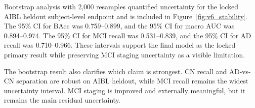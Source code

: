Bootstrap analysis with 2{,}000 resamples quantified uncertainty for the locked AIBL heldout subject-level endpoint and is included in Figure~\ref{fig:v6_stability}. The 95\% CI for BAcc was 0.759--0.899, and the 95\% CI for macro AUC was 0.894--0.974. The 95\% CI for MCI recall was 0.531--0.839, and the 95\% CI for AD recall was 0.710--0.966. These intervals support the final model as the locked primary result while preserving MCI staging uncertainty as a visible limitation.

The bootstrap result also clarifies which claim is strongest. CN recall and AD-vs-CN separation are robust on AIBL heldout, while MCI recall remains the widest uncertainty interval. MCI staging is improved and externally meaningful, but it remains the main residual uncertainty.

\begin{figure}[p]
    \centering
\end{figure}
